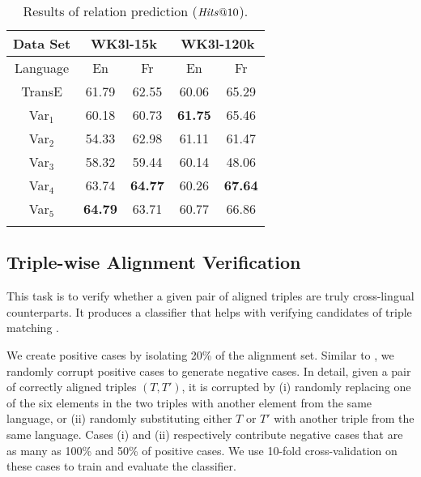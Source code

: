 \documentclass{article}
\def\inv{\vspace{-0.1cm}}
\begin{document}
\begin{table*}[t!]
\begin{minipage}[t]{0.3\linewidth}
\caption{Results of relation prediction ($\mathit{Hits}\mbox{@}10$).}\label{tbl:relation}
\vspace{-1em}
{\scriptsize
\begin{tabular}{c|cc|cc}
\bhline
Data Set & \multicolumn{2}{c|}{WK3l-15k} & \multicolumn{2}{c}{WK3l-120k}\\
\hline
Language & En & Fr & En & Fr\\
\bhline
TransE&61.79&62.55&60.06&65.29\\
Var${_1}$&60.18&60.73&\textbf{61.75}&65.46\\
Var${_2}$&54.33&62.98&61.11&61.47\\
Var${_3}$&58.32&59.44&60.14&48.06\\
Var${_4}$&63.74&\textbf{64.77}&60.26&\textbf{67.64}\\
Var${_5}$&\textbf{64.79}&63.71&60.77&66.86\\
\bhline
\end{tabular}
}
\end{minipage}
\vspace{-1.5em}
\end{table*}

\inv\inv
\subsection{Triple-wise Alignment Verification}

This task is to verify whether a given pair of aligned triples are truly cross-lingual counterparts. It produces a classifier that helps with verifying candidates of triple matching \cite{nguyen2011multi,rinser2013cross}. \par

 We create positive cases by isolating 20\% of the alignment set. Similar to \cite{socher2013reasoning}, we randomly corrupt positive cases to generate negative cases. In detail, given a pair of correctly aligned triples $(T, T')$, it is corrupted by (i) randomly replacing one of the six elements in the two triples with another element from the same language, or (ii) randomly substituting either $T$ or $T'$ with another triple from the same language. Cases (i) and (ii) respectively contribute
negative cases that are as many as 100\% and 50\% of positive cases.
We use 10-fold cross-validation on these cases to train and evaluate the classifier.
\end{document}
